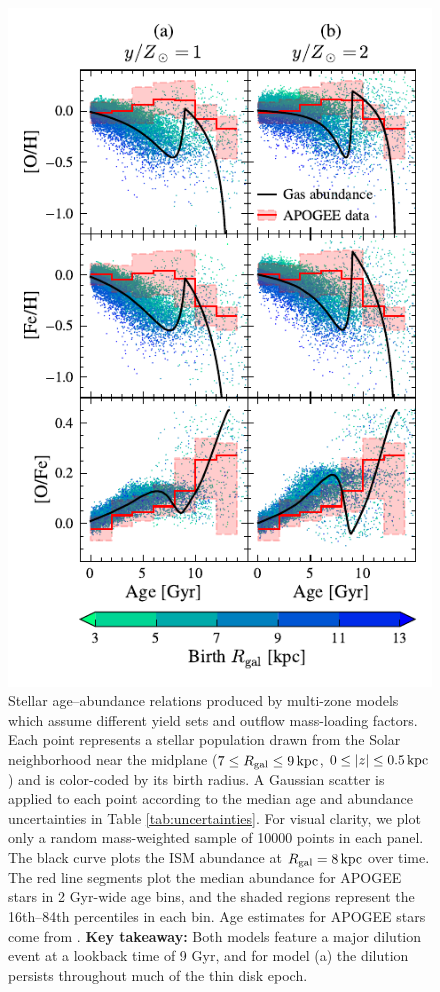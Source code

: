 \documentclass[twocolumn,twocolappendix,linenumbers]{aastex631}
\newcommand{\kpc}{\,{\rm kpc}}
\begin{document}
\begin{figure}
    \centering
    \includegraphics[width=\linewidth]{figures/abundance_evolution_yields.pdf}
    \caption{Stellar age--abundance relations produced by multi-zone models which assume different yield sets and outflow mass-loading factors. Each point represents a stellar population drawn from the Solar neighborhood near the midplane ($7\leq R_{\rm gal}\leq 9\kpc$, $0\leq |z| \leq 0.5\kpc$) and is color-coded by its birth radius. A Gaussian scatter is applied to each point according to the median age and abundance uncertainties in Table \ref{tab:uncertainties}. For visual clarity, we plot only a random mass-weighted sample of \num{10000} points in each panel. The black curve plots the ISM abundance at $R_{\rm gal}=8\kpc$ over time. The red line segments plot the median abundance for APOGEE stars in {2 Gyr}-wide age bins, and the shaded regions represent the 16th--84th percentiles in each bin. Age estimates for APOGEE stars come from \citet{leung_variational_2023}. {\bf Key takeaway:} Both models feature a major dilution event at a lookback time of 9 Gyr, and for model (a) the dilution persists throughout much of the thin disk epoch.}
    \label{fig:abundance-evolution-yields}
\end{figure}
\end{document}
